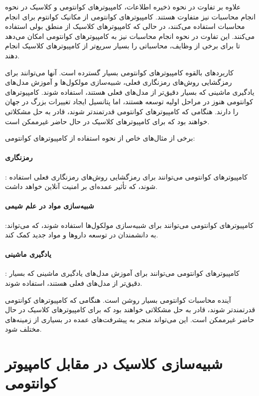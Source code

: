 \documentclass{book}
\begin{document}
علاوه بر تفاوت در نحوه ذخیره اطلاعات، کامپیوترهای کوانتومی و کلاسیک در نحوه انجام محاسبات نیز متفاوت هستند. کامپیوترهای کوانتومی از مکانیک کوانتوم برای انجام محاسبات استفاده می‌کنند، در حالی که کامپیوترهای کلاسیک از منطق بولی استفاده می‌کنند. این تفاوت در نحوه انجام محاسبات نیز به کامپیوترهای کوانتومی امکان می‌دهد تا برای برخی از وظایف، محاسباتی را بسیار سریع‌تر از کامپیوترهای کلاسیک انجام دهند.

کاربردهای بالقوه کامپیوترهای کوانتومی بسیار گسترده است. آنها می‌توانند برای رمزگشایی روش‌های رمزنگاری فعلی، شبیه‌سازی مولکول‌ها و آموزش مدل‌های یادگیری ماشینی که بسیار دقیق‌تر از مدل‌های فعلی هستند، استفاده شوند. کامپیوترهای کوانتومی هنوز در مراحل اولیه توسعه هستند، اما پتانسیل ایجاد تغییرات بزرگ در جهان را دارند. هنگامی که کامپیوترهای کوانتومی قدرتمندتر شوند، قادر به حل مشکلاتی خواهند بود که برای کامپیوترهای کلاسیک در حال حاضر غیرممکن است.

 برخی از مثال‌های خاص از نحوه استفاده از کامپیوترهای کوانتومی:

\paragraph{رمزنگاری}: کامپیوترهای کوانتومی می‌توانند برای رمزگشایی روش‌های رمزنگاری فعلی استفاده شوند، که تأ‌ثیر عمده‌ای بر امنیت آنلاین خواهد داشت.
\paragraph{شبیه‌سازی مواد در علم شیمی}:کامپیوترهای کوانتومی می‌توانند برای شبیه‌سازی مولکول‌ها استفاده شوند، که می‌تواند به دانشمندان در توسعه داروها و مواد جدید کمک کند.
\paragraph{یادگیری ماشینی}: کامپیوترهای کوانتومی می‌توانند برای آموزش مدل‌های یادگیری ماشینی که بسیار دقیق‌تر از مدل‌های فعلی هستند، استفاده شوند.

آینده محاسبات کوانتومی بسیار روشن است. هنگامی که کامپیوترهای کوانتومی قدرتمندتر شوند، قادر به حل مشکلاتی خواهند بود که برای کامپیوترهای کلاسیک در حال حاضر غیرممکن است. این می‌تواند منجر به پیشرفت‌های عمده در بسیاری از زمینه‌های مختلف شود.
\section{شبیه‌سازی کلاسیک در مقابل کامپیوتر کوانتومی}
\end{document}
